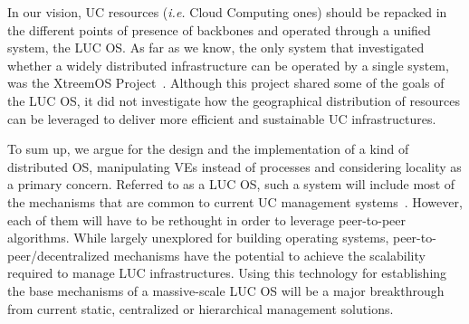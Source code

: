 In our vision, UC resources (\textit{i.e.} Cloud Computing ones) should be repacked in
the different points of presence of backbones and operated through a unified system, the LUC OS.
%
As far as we know, the only system that investigated whether a
widely distributed infrastructure can be operated by a single system, was the
XtreemOS Project~\cite{morin:2007}. Although this project shared some of
the goals of the LUC OS, it did not investigate how the geographical
distribution of resources can be leveraged to deliver more efficient and sustainable
UC infrastructures. 
%

To sum up,  we argue for the design and the implementation of a kind of distributed OS,
manipulating VEs instead of processes and considering locality as a primary concern. 
Referred to as a LUC OS, such
a system will include most of the mechanisms that are common to current UC
management systems~\cite{cloudstack,nimbus,opennebula,openstack,lowe:wiley11,moreno:2012}.  However,
each of them will have to be rethought in order to leverage peer-to-peer algorithms.
%
While largely unexplored for building operating systems,
peer-to-peer/decentralized mechanisms have the potential to achieve the scalability required
to manage LUC infrastructures.
Using this technology for establishing the base mechanisms of a
massive-scale LUC OS will be a major breakthrough from
current static, centralized or hierarchical management solutions.

%
